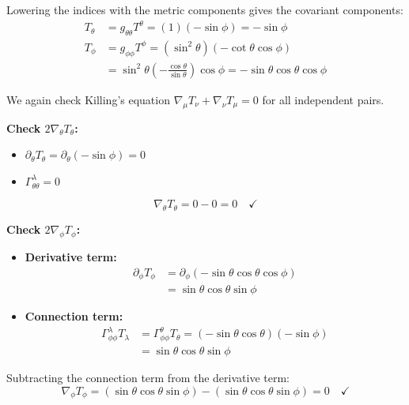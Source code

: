 \documentclass[11pt, a4paper]{report}
\begin{document}
Lowering the indices with the metric components gives the covariant components:
\begin{align}
T_\theta &= g_{\theta\theta} T^\theta = (1)(-\sin\phi) = -\sin\phi \\
T_\phi &= g_{\phi\phi} T^\phi = (\sin^2\theta)(-\cot\theta \cos\phi) \nonumber \\
       &= \sin^2\theta \left(-\frac{\cos\theta}{\sin\theta}\right)\cos\phi = -\sin\theta\cos\theta\cos\phi
\end{align}

We again check Killing's equation $\nabla_\mu T_\nu + \nabla_\nu T_\mu = 0$ for all independent pairs.

\textbf{Check \(2\nabla_\theta T_\theta\):}
\begin{itemize}
    \item $\partial_\theta T_\theta = \partial_\theta(-\sin\phi) = 0$
    \item $\Gamma^\lambda_{\theta\theta} = 0$
\end{itemize}
\begin{equation}
\nabla_\theta T_\theta = 0 - 0 = 0 \quad \checkmark
\end{equation}

\textbf{Check \(2\nabla_\phi T_\phi\):}
\begin{itemize}
    \item \textbf{Derivative term:}
    \begin{align*}
    \partial_\phi T_\phi &= \partial_\phi(-\sin\theta\cos\theta\cos\phi) \\
    &= \sin\theta\cos\theta \sin\phi
    \end{align*}
    \item \textbf{Connection term:}
    \begin{align*}
    \Gamma^\lambda_{\phi\phi} T_\lambda &= \Gamma^\theta_{\phi\phi} T_\theta = (-\sin\theta\cos\theta)(-\sin\phi) \\
    &= \sin\theta\cos\theta\sin\phi
    \end{align*}
\end{itemize}
Subtracting the connection term from the derivative term:
\begin{equation}
\nabla_\phi T_\phi = (\sin\theta\cos\theta\sin\phi) - (\sin\theta\cos\theta\sin\phi) = 0 \quad \checkmark
\end{equation}
\end{document}
